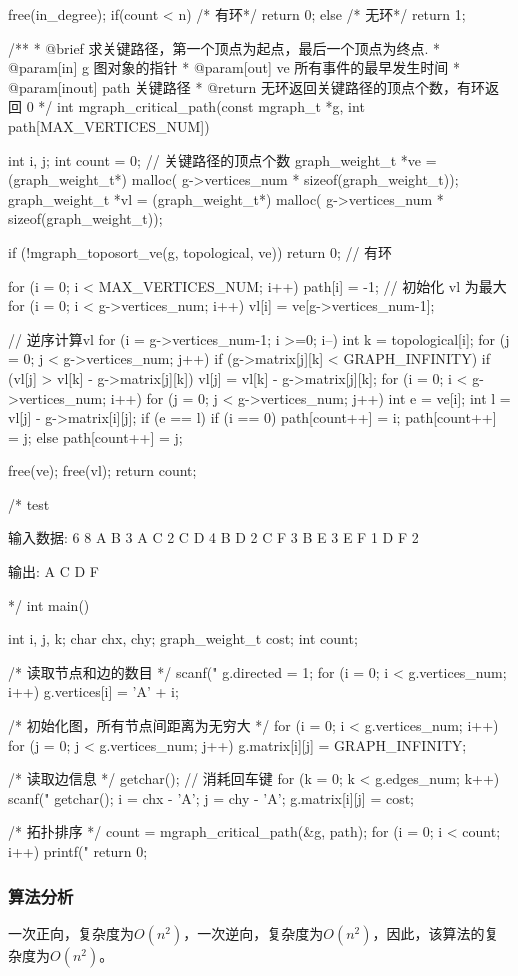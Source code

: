 \begin{Codex}[label=mgraph_critical_path.c]
{    free(in_degree);
    if(count < n) { /* 有环*/
        return 0;
    } else { /* 无环*/
        return 1;
    }
}

/**
  * @brief 求关键路径，第一个顶点为起点，最后一个顶点为终点.
  * @param[in] g 图对象的指针
  * @param[out] ve 所有事件的最早发生时间
  * @param[inout] path 关键路径
  * @return 无环返回关键路径的顶点个数，有环返回 0
  */
int mgraph_critical_path(const mgraph_t *g, int path[MAX_VERTICES_NUM]) {
    int i, j;
    int count = 0;    // 关键路径的顶点个数
    graph_weight_t *ve = (graph_weight_t*) malloc(
            g->vertices_num * sizeof(graph_weight_t));
    graph_weight_t *vl = (graph_weight_t*) malloc(
            g->vertices_num * sizeof(graph_weight_t));

    if (!mgraph_toposort_ve(g, topological, ve)) return 0;  // 有环

    for (i = 0; i < MAX_VERTICES_NUM; i++) path[i] = -1;
    // 初始化 vl 为最大
    for (i = 0; i < g->vertices_num; i++) vl[i] = ve[g->vertices_num-1];

    // 逆序计算vl
    for (i = g->vertices_num-1; i >=0; i--) {
        int k = topological[i];
        for (j = 0; j < g->vertices_num; j++) {
            if (g->matrix[j][k] < GRAPH_INFINITY) {
                if (vl[j] > vl[k] - g->matrix[j][k])
                    vl[j] = vl[k] - g->matrix[j][k];
            }
        }
    }
    for (i = 0; i < g->vertices_num; i++) {
        for (j = 0; j < g->vertices_num; j++) {
            int e = ve[i];
            int l = vl[j] - g->matrix[i][j];
            if (e == l) {
                if (i == 0) {
                    path[count++] = i;
                    path[count++] = j;
                } else {
                    path[count++] = j;
                }
            }
        }
    }

    free(ve);
    free(vl);
    return count;
}


/* test

输入数据:
6 8
A B 3
A C 2
C D 4
B D 2
C F 3
B E 3
E F 1
D F 2

输出: A C D F

*/
int main() {
    int i, j, k;
    char chx, chy;
    graph_weight_t cost;
    int count;

    /* 读取节点和边的数目 */
    scanf("%
    g.directed = 1;
    for (i = 0; i < g.vertices_num; i++) g.vertices[i] = 'A' + i;

    /* 初始化图，所有节点间距离为无穷大 */
    for (i = 0; i < g.vertices_num; i++) {
        for (j = 0; j < g.vertices_num; j++) {
            g.matrix[i][j] = GRAPH_INFINITY;
        }
    }

    /* 读取边信息 */
    getchar(); // 消耗回车键
    for (k = 0; k < g.edges_num; k++) {
        scanf("%
        getchar();
        i = chx - 'A';
        j = chy - 'A';
        g.matrix[i][j] = cost;
    }

    /* 拓扑排序 */
    count = mgraph_critical_path(&g, path);
    for (i = 0; i < count; i++) {
        printf("%
    }
    return 0;
}
\end{Codex}

\subsubsection{算法分析}
一次正向，复杂度为$O(n^2)$，一次逆向，复杂度为$O(n^2)$，因此，该算法的复杂度为$O(n^2)$。
